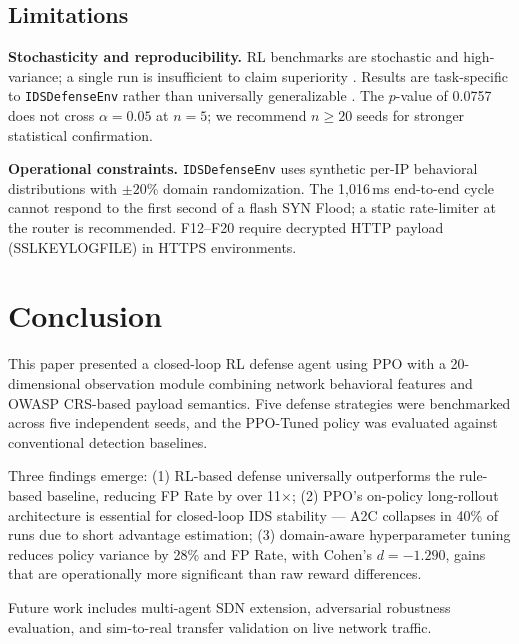 \documentclass[conference]{IEEEtran}
\begin{document}
\subsection{Limitations}

\textbf{Stochasticity and reproducibility.} RL benchmarks are stochastic
and high-variance; a single run is insufficient to claim superiority
\cite{henderson2018deeprl}. Results are task-specific to \texttt{IDSDefenseEnv}
rather than universally generalizable \cite{colas2019seeds,engstrom2020}.
The $p$-value of 0.0757 does not cross $\alpha{=}0.05$ at $n{=}5$; we
recommend $n{\geq}20$ seeds for stronger statistical confirmation.

\textbf{Operational constraints.} \texttt{IDSDefenseEnv} uses synthetic
per-IP behavioral distributions with ${\pm}20\%$ domain randomization. The 1,016\,ms end-to-end cycle
cannot respond to the first second of a flash SYN Flood; a static
rate-limiter at the router is recommended. F12--F20 require decrypted
HTTP payload (SSLKEYLOGFILE) in HTTPS environments.

\section{Conclusion}

This paper presented a closed-loop RL defense agent using PPO with a
20-dimensional observation module combining network behavioral features and
OWASP CRS-based payload semantics. Five defense strategies were benchmarked
across five independent seeds, and the PPO-Tuned policy was evaluated against
conventional detection baselines.

Three findings emerge: (1) RL-based defense universally outperforms the
rule-based baseline, reducing FP Rate by over 11$\times$; (2) PPO's
on-policy long-rollout architecture is essential for closed-loop IDS
stability --- A2C collapses in 40\% of runs due to short advantage
estimation; (3) domain-aware hyperparameter tuning reduces policy variance
by 28\% and FP Rate, with Cohen's $d{=}{-1.290}$, gains that are
operationally more significant than raw reward differences.

Future work includes multi-agent SDN extension, adversarial robustness
evaluation, and sim-to-real transfer validation on live network traffic.
\end{document}
